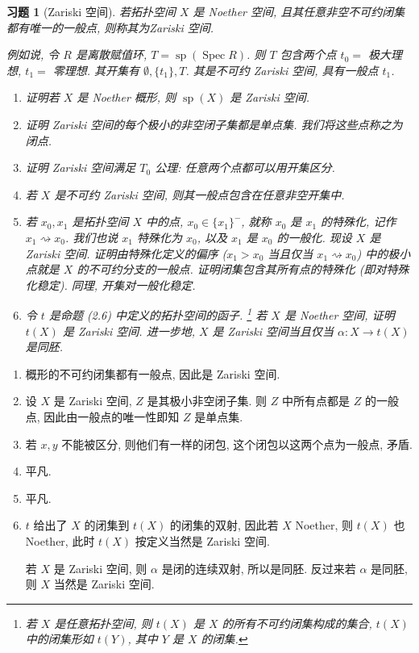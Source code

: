 \documentclass{article}
\makeatletter
\theoremstyle{exercise}
\newtheorem{exercise}{习题}[section]
\newenvironment{proofc}{\proof}{\endproof}
\def\printfootnotes{}
\def\spto{\rightsquigarrow}
\def\spp{\operatorname{sp}}
\def\Spec{\operatorname{Spec}}
\def\clearfootnotes{\def\@printfootnotes{}}
\makeatother
\begin{document}
\begin{exercise}[Zariski 空间]
  若拓扑空间 $X$ 是 Noether 空间, 且其任意非空不可约闭集都有唯一的一般点,
  则称其为\emph{Zariski 空间}.

  例如说, 令 $R$ 是离散赋值环, $T = \spp(\Spec R)$.
  则 $T$ 包含两个点 $t_0 = $ 极大理想, $t_1 = $ 零理想.
  其开集有 $\emptyset, \{ t_1 \}, T$.
  其是不可约 Zariski 空间, 具有一般点 $t_1$.

  \begin{enumerate}[label={(\alph*)}]
    \item 证明若 $X$ 是 Noether 概形, 则 $\spp(X)$ 是 Zariski 空间.
    \item 证明 Zariski 空间的每个极小的非空闭子集都是单点集. 我们将这些点称之为闭点.
    \item 证明 Zariski 空间满足 $T_0$ 公理: 任意两个点都可以用开集区分.
    \item 若 $X$ 是不可约 Zariski 空间, 则其一般点包含在任意非空开集中.
    \item 若 $x_0, x_1$ 是拓扑空间 $X$ 中的点, $x_0 \in \{x_1\}^-$,
          就称 $x_0$ 是 $x_1$ 的\emph{特殊化}, 记作 $x_1 \spto x_0$.
          我们也说 $x_1$ \emph{特殊化为} $x_0$, 以及 $x_1$ 是 $x_0$ 的\emph{一般化}.
          现设 $X$ 是 Zariski 空间.
          证明由特殊化定义的偏序 ($x_1 > x_0$ 当且仅当 $x_1 \spto x_0$)
          中的极小点就是 $X$ 的不可约分支的一般点.
          证明闭集包含其所有点的特殊化 (即\emph{对特殊化稳定}).
          同理, 开集\emph{对一般化稳定}.
    \item 令 $t$ 是命题 (2.6) 中定义的拓扑空间的函子.%
          \footnote{
          若 $X$ 是任意拓扑空间, 则 $t(X)$ 是 $X$ 的所有不可约闭集构成的集合,
          $t(X)$ 中的闭集形如 $t(Y)$, 其中 $Y$ 是 $X$ 的闭集.}%
          若 $X$ 是 Noether 空间, 证明 $t(X)$ 是 Zariski 空间.
          进一步地, $X$ 是 Zariski 空间当且仅当 $\alpha \colon X \to t(X)$ 是同胚.
  \end{enumerate}
\end{exercise}
\printfootnotes
\clearfootnotes

\begin{proofc}
  \begin{enumerate}[label={(\alph*)}]
    \item 概形的不可约闭集都有一般点, 因此是 Zariski 空间.
    \item 设 $X$ 是 Zariski 空间, $Z$ 是其极小非空闭子集.
          则 $Z$ 中所有点都是 $Z$ 的一般点, 因此由一般点的唯一性即知 $Z$ 是单点集.
    \item 若 $x, y$ 不能被区分, 则他们有一样的闭包, 这个闭包以这两个点为一般点, 矛盾.
    \item 平凡.
    \item 平凡.
    \item $t$ 给出了 $X$ 的闭集到 $t(X)$ 的闭集的双射,
          因此若 $X$ Noether, 则 $t(X)$ 也 Noether,
          此时 $t(X)$ 按定义当然是 Zariski 空间.

          若 $X$ 是 Zariski 空间, 则 $\alpha$ 是闭的连续双射, 所以是同胚.
          反过来若 $\alpha$ 是同胚, 则 $X$ 当然是 Zariski 空间.
          \qedhere
  \end{enumerate}
\end{proofc}
\end{document}

